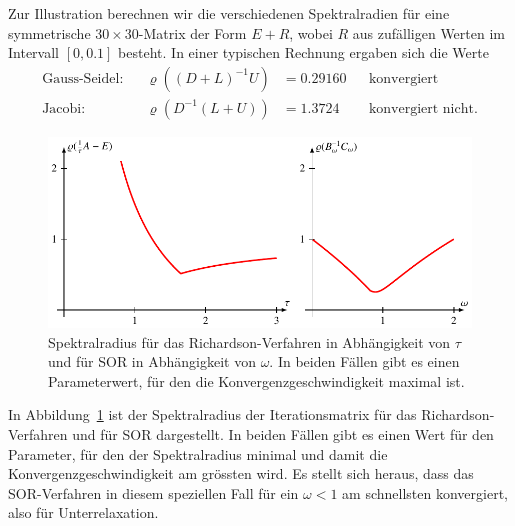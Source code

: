 \begin{beispiel}
Zur Illustration berechnen wir die verschiedenen Spektralradien für
eine symmetrische $30\times 30$-Matrix der Form $E + R$,
wobei $R$ aus zufälligen Werten
im Intervall $[0,0.1]$ besteht.
In einer typischen Rechnung ergaben sich die Werte
\[
\begin{aligned}
\text{Gauss-Seidel:}&&
\varrho((D+L)^{-1}U) &=  0.29160
&&\text{konvergiert}
\\
\text{Jacobi:}&&
\varrho(D^{-1}(L+U)) &=  1.3724
&&\text{konvergiert nicht.}
\end{aligned}
\]
\begin{figure}
\centering
\includegraphics{chapters/60-linsys/images/sp.pdf}
\caption{Spektralradius für das Richardson-Verfahren in Abhängigkeit
von $\tau$ und für SOR in Abhängigkeit von $\omega$.
In beiden Fällen gibt es einen Parameterwert, für den die
Konvergenzgeschwindigkeit maximal ist.
\label{buch:figure:spektralradius}}
\end{figure}%
In Abbildung~\ref{buch:figure:spektralradius}
ist der Spektralradius der Iterationsmatrix für
das Richardson-Verfahren und für SOR dargestellt.
In beiden Fällen gibt es einen Wert für den Parameter,
für den der Spektralradius minimal und damit die Konvergenzgeschwindigkeit
am grössten wird.
%
Es stellt sich heraus, dass das SOR-Verfahren in diesem speziellen Fall
für ein $\omega<1$ am schnellsten konvergiert, also für Unterrelaxation.
\end{beispiel}



